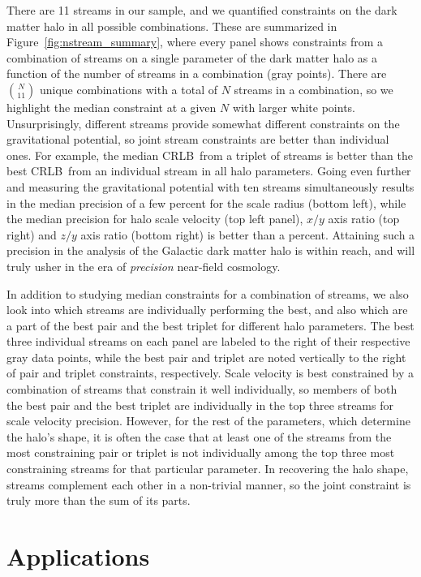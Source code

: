 \documentclass[modern]{aastex62}
\newcommand{\acronym}[1]{{\small{#1}}}
\newcommand{\CRLB}{\acronym{CRLB}}
\begin{document}
There are 11 streams in our sample, and we quantified constraints on the dark matter halo in all possible combinations.
These are summarized in Figure~\ref{fig:nstream_summary}, where every panel shows constraints from a combination of streams on a single parameter of the dark matter halo as a function of the number of streams in a combination (gray points).
There are $\binom{N}{11}$ unique combinations with a total of $N$ streams in a combination, so we highlight the median constraint at a given $N$ with larger white points.
Unsurprisingly, different streams provide somewhat different constraints on the gravitational potential, so joint stream constraints are better than individual ones.
For example, the median \CRLB\ from a triplet of streams is better than the best \CRLB\ from an individual stream in all halo parameters.
Going even further and measuring the gravitational potential with ten streams simultaneously results in the median precision of a few percent for the scale radius (bottom left), while the median precision for halo scale velocity (top left panel), $x/y$ axis ratio (top right) and $z/y$ axis ratio (bottom right) is better than a percent.
Attaining such a precision in the analysis of the Galactic dark matter halo is within reach, and will truly usher in the era of \emph{precision} near-field cosmology.

In addition to studying median constraints for a combination of streams, we also look into which streams are individually performing the best, and also which are a part of the best pair and the best triplet for different halo parameters.
The best three individual streams on each panel are labeled to the right of their respective gray data points, while the best pair and triplet are noted vertically to the right of pair and triplet constraints, respectively.
Scale velocity is best constrained by a combination of streams that constrain it well individually, so members of both the best pair and the best triplet are individually in the top three streams for scale velocity precision.
However, for the rest of the parameters, which determine the halo's shape, it is often the case that at least one of the streams from the most constraining pair or triplet is not individually among the top three most constraining streams for that particular parameter.
In recovering the halo shape, streams complement each other in a non-trivial manner, so the joint constraint is truly more than the sum of its parts.


\section{Applications}
\label{sec:applications}
\end{document}

